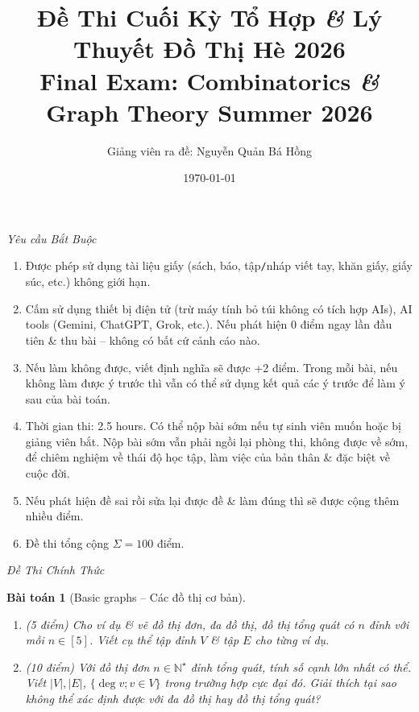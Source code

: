 \documentclass{article}
\title{Đề Thi Cuối Kỳ Tổ Hợp {\it\&} Lý Thuyết Đồ Thị Hè 2026\\Final Exam: Combinatorics {\it\&} Graph Theory Summer 2026}
\author{Giảng viên ra đề: Nguyễn Quản Bá Hồng}
\date{\today}
\newtheorem{baitoan}{Bài toán}
\begin{document}
\maketitle
\begin{center}\large
	\emph{\textsf{Yêu cầu Bắt Buộc}}
\end{center}

\begin{enumerate}
	\item Được phép sử dụng tài liệu giấy (sách, báo, tập{\tt/}nháp viết tay, khăn giấy, giấy súc, etc.) không giới hạn.
	\item Cấm sử dụng thiết bị điện tử (trừ máy tính bỏ túi không có tích hợp AIs), AI tools (Gemini, ChatGPT, Grok, etc.). Nếu phát hiện 0 điểm ngay lần đầu tiên \& thu bài -- không có bất cứ cảnh cáo nào.
	\item Nếu làm không được, viết định nghĩa sẽ được +2 điểm. Trong mỗi bài, nếu không làm được ý trước thì vẫn có thể sử dụng kết quả các ý trước để làm ý sau của bài toán.
	\item Thời gian thi: 2.5 hours. Có thể nộp bài sớm nếu tự sinh viên muốn hoặc bị giảng viên bắt. Nộp bài sớm vẫn phải ngồi lại phòng thi, không được về sớm, để chiêm nghiệm về thái độ học tập, làm việc của bản thân \& đặc biệt về cuộc đời.
	\item Nếu phát hiện đề sai rồi sửa lại được đề \& làm đúng thì sẽ được cộng thêm nhiều điểm.
	\item Đề thi tổng cộng $\Sigma = 100$ điểm.
\end{enumerate}

\begin{center}\large
	\emph{\textsf{Đề Thi Chính Thức}}
\end{center}

\begin{baitoan}[Basic graphs -- Các đồ thị cơ bản]
	\begin{enumerate}[label=(\alph*)]
		\item \emph{(5 điểm)} Cho ví dụ \& vẽ đồ thị đơn, đa đồ thị, đồ thị tổng quát có $n$ đỉnh với mỗi $n\in[5]$. Viết cụ thể tập đỉnh $V$ \& tập $E$ cho từng ví dụ.
		\item \emph{(10 điểm)} Với đồ thị đơn $n\in\mathbb{N}^\star$ đỉnh tổng quát, tính số cạnh lớn nhất có thể. Viết $|V|,|E|$, $\{\deg v;v\in V\}$ trong trường hợp cực đại đó. Giải thích tại sao không thể xác định được với đa đồ thị hay đồ thị tổng quát?
	\end{enumerate}
\end{baitoan}
\end{document}
